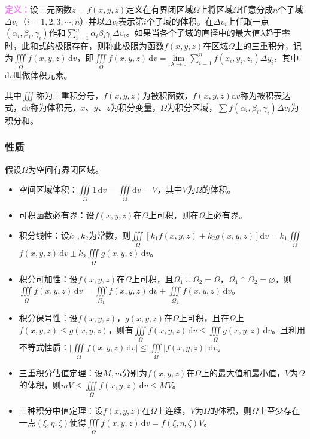 \documentclass[UTF8, 12pt]{ctexart}
\begin{document}
\textcolor{violet}{\textbf{定义：}}设三元函数$z=f(x,y,z)$定义在有界闭区域$\Omega$上将区域$\Omega$任意分成$n$个子域$\Delta v_i$（$i=1,2,3,\cdots,n$）并以$\Delta v_i$表示第$i$个子域的体积。在$\Delta v_i$上任取一点$(\alpha_i,\beta_i,\gamma_i)$作和$\sum\limits_{i=1}^n\alpha_i\beta_i\gamma_i\Delta v_i$。如果当各个子域的直径中的最大值$\lambda$趋于零时，此和式的极限存在，则称此极限为函数$f(x,y,z)$在区域$\Omega$上的三重积分，记为$\iiint\limits_\Omega f(x,y,z)\,\textrm{d}v$，即$\iiint\limits_\Omega f(x,y,z)\,\textrm{d}v=\lim\limits_{\lambda\to0}\sum\limits_{i=1}^nf(x_i,y_i,z_i)\Delta y_i$，其中$\textrm{d}v$叫做体积元素。

其中$\iiint$称为三重积分号，$f(x,y,z)$为被积函数，$f(x,y,z)\textrm{d}v$称为被积表达式，$\textrm{d}v$称为体积元，$x$、$y$、$z$为积分变量，$\Omega$为积分区域，$\sum f(\alpha_i,\beta_i,\gamma_i)\Delta v_i$为积分和。

\subsubsection{性质}

假设$\Omega$为空间有界闭区域。

\begin{itemize}
    \item 空间区域体积：$\iiint\limits_\Omega1\,\textrm{d}v=\iiint\limits_\Omega\textrm{d}v=V$，其中$V$为$\Omega$的体积。
    \item 可积函数必有界：设$f(x,y,z)$在$\Omega$上可积，则在$\Omega$上必有界。
    \item 积分线性：设$k_1,k_2$为常数，则$\iiint\limits_\Omega[k_1f(x,y,z)\pm k_2g(x,y,z)]\textrm{d}v=k_1\iiint\limits_\Omega$\\$f(x,y,z)\,\textrm{d}v\pm k_2\iiint\limits_\Omega g(x,y,z)\,\textrm{d}v$。
    \item 积分可加性：设$f(x,y,z)$在$\Omega$上可积，且$\Omega_1\cup\Omega_2=\Omega$，$\Omega_1\cap\Omega_2=\varnothing$，则$\iiint\limits_\Omega f(x,y,z)\,\textrm{d}v=\iiint\limits_{\Omega_1}f(x,y,z)\,\textrm{d}v+\iiint\limits_{\Omega_2}f(x,y,z)\,\textrm{d}v$。
    \item 积分保号性：设$f(x,y,z)$，$g(x,y,z)$在$\Omega$上可积，且在$\Omega$上$f(x,y,z)\leqslant g(x,y,z)$，则有$\iiint\limits_\Omega f(x,y,z)\,\textrm{d}v\leqslant\iiint\limits_\Omega g(x,y,z)\,\textrm{d}v$。且利用不等式性质：$\vert\iiint\limits_\Omega f(x,y,z)\,\textrm{d}v\vert\leqslant\iiint\limits_\Omega\vert f(x,y,z)\vert\,\textrm{d}v$。
    \item 三重积分估值定理：设$M,m$分别为$f(x,y,z)$在$\Omega$上的最大值和最小值，$V$为$\Omega$的体积，则$mV\leqslant\iiint\limits_\Omega f(x,y,z)\,\textrm{d}v\leqslant MV$。
    \item 三种积分中值定理：设$f(x,y,z)$在$\Omega$上连续，$V$为$\Omega$的体积，则$\Omega$上至少存在一点$(\xi,\eta,\zeta)$使得$\iiint\limits_\Omega f(x,y,z)\,\textrm{d}v=f(\xi,\eta,\zeta)V$。
\end{itemize}
\end{document}
